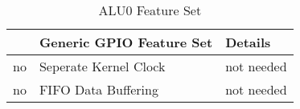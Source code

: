 \begin{table}[H]
\caption{ALU0 Feature Set}
\label{tab:asGpioPer01}
\centering
\begin{tabularx}{\textwidth}{|l |l |X|}
  \hline
   & Generic GPIO Feature Set & Details \\
  \hline
  \hline
  no & Seperate Kernel Clock & not needed \\
  \hline
  no & FIFO Data Buffering & not needed \\
  \hline
\end{tabularx}
\end{table}
